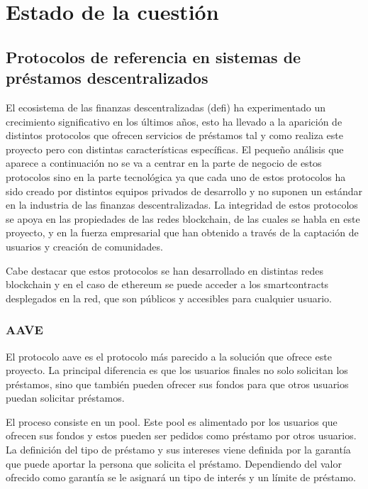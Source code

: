 \chapter{Estado de la cuestión}
\label{ch:estadodelacuestion}
 
\section{Protocolos de referencia en sistemas de  préstamos descentralizados}
El ecosistema de las finanzas descentralizadas (\gls{defi}) ha experimentado un 
crecimiento significativo en los últimos años,
esto ha llevado a la aparición de distintos protocolos que ofrecen servicios
de préstamos tal y como realiza este proyecto pero con distintas características 
específicas.
El pequeño análisis que aparece a continuación no se va a centrar en la parte de
negocio de estos protocolos sino en la parte tecnológica ya que cada uno de estos protocolos ha sido creado por
distintos equipos privados de desarrollo  y no suponen un estándar en la
industria de las finanzas descentralizadas. 
La integridad de estos protocolos se apoya en las propiedades
de las redes \gls{blockchain}, de las cuales se habla en este proyecto, y
en la fuerza empresarial que han obtenido a través de la captación de usuarios 
y creación de comunidades.

Cabe destacar que estos protocolos se han desarrollado en distintas redes 
\gls{blockchain} y en el caso de \gls{ethereum} se puede acceder a los
\glspl{smartcontract} desplegados en la red, que son públicos y accesibles para 
cualquier usuario.

\subsection{AAVE}
El protocolo \gls{aave} es el protocolo más parecido a la solución que ofrece este proyecto. 
La principal diferencia es que los usuarios finales no solo solicitan los préstamos, sino que
 también pueden ofrecer sus fondos para que otros usuarios puedan solicitar préstamos.

El proceso consiste en un \gls{pool}.
Este \gls{pool} es alimentado por los usuarios que ofrecen sus fondos y estos pueden ser pedidos
como préstamo por otros usuarios.
La definición del tipo de préstamo y sus intereses viene definida por la garantía que puede aportar 
la persona que solicita el préstamo. Dependiendo del valor ofrecido como garantía se le asignará un tipo de interés y un límite de préstamo.

